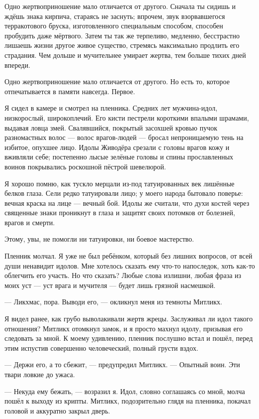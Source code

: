 Одно жертвоприношение мало отличается от другого.
Сначала ты сидишь и ждёшь знака кирпича, стараясь не заснуть;
впрочем, звук взорвавшегося терракотового бруска, изготовленного специальным способом, способен пробудить даже мёртвого.
Затем ты так же терпеливо, медленно, бесстрастно лишаешь жизни другое живое существо, стремясь максимально продлить его страдания.
Чем дольше и мучительнее умирает жертва, тем больше тихих дней впереди.

Одно жертвоприношение мало отличается от другого.
Но есть то, которое отпечатывается в памяти навсегда.
Первое.

Я сидел в камере и смотрел на пленника.
Средних лет мужчина-идол, низкорослый, широкоплечий.
Его кисти пестрели короткими впалыми шрамами, выдавая ловца змей.
Свалявшийся, покрытый засохшей кровью пучок разномастных волос --- волос врагов-людей --- бросал непроницаемую тень на избитое, опухшее лицо.
Идолы Живодёра срезали с головы врагов кожу и вживляли себе;
постепенно лысые зелёные головы и спины прославленных воинов покрывались роскошной пёстрой шевелюрой.

Я хорошо помню, как тускло мерцали из-под татуированных век лишённые белков глаза.
Сели редко татуировали лицо;
у моего народа бытовало поверье: вечная краска на лице --- вечный бой.
Идолы же считали, что духи костей через священные знаки проникнут в глаза и защитят своих потомков от болезней, врагов и смерти.

Этому, увы, не помогли ни татуировки, ни боевое мастерство.

Пленник молчал.
Я уже не был ребёнком, который без лишних вопросов, от всей души ненавидит идолов.
Мне хотелось сказать ему что-то напоследок, хоть как-то облегчить его участь.
Но что сказать?
Любые слова излишни, любая фраза из моих уст --- уст врага и мучителя --- будет лишь грязной насмешкой.

--- Ликхмас, пора.
Выводи его, --- окликнул меня из темноты Митликх.

Я видел ранее, как грубо выволакивали жертв жрецы.
Заслуживал ли идол такого отношения?
Митликх отомкнул замок, и я просто махнул идолу, призывая его следовать за мной.
К моему удивлению, пленник послушно встал и пошёл, перед этим испустив совершенно человеческий, полный грусти вздох.

--- Держи его, а то сбежит, --- предупредил Митликх.
--- Опытный воин.
Эти твари ловкие до ужаса.

--- Некуда ему бежать, --- возразил я.
Идол, словно соглашаясь со мной, молча пошёл к выходу из крипты.
Митликх, подозрительно глядя на пленника, покачал головой и аккуратно закрыл дверь.

